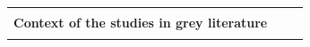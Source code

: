 \documentclass[english, 12pt, a4paper, sci, utf8, a-1b, online]{aaltothesis}
\begin{document}
{\begin{center}
\begin{longtable}{p{0.3\linewidth}p{0.6\linewidth}}
      &                                                                                                                                                                                                                                                                                                                                                                                                                                                                                                                                                                                                                                                                                                                                                                                                                                                 \\
      \multicolumn{2}{l}{\textbf{Context of the studies in grey literature}}                                                                                                                                                                                                                                                                                                                                                                                                                                                                                                                                                                                                                                                                                                                                                                                                                                                 \\
      \hline                                                                                                                                                                                                                                                                                                                                                                                                                                                                                                                                                                                                                                                                                                                                                                                                                                                                              \\

\end{longtable}
\end{center}}
\end{document}
